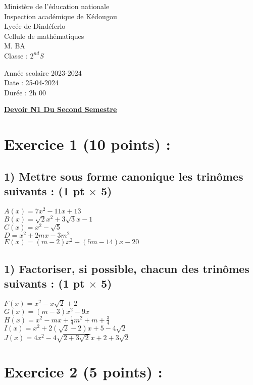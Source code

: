 \documentclass{article}
\begin{document}
\begin{minipage}{0.5\textwidth}
	Ministère de l'éducation nationale  \\
	Inspection académique de Kédougou   \\
	Lycée de Dindéferlo            \\
	Cellule de mathématiques            \\
	M. BA                          \\
	Classe : $2^{nd}S$  \\
\end{minipage}
\begin{minipage}{0.5\textwidth}
	Année scolaire 2023-2024 \\
	Date : 25-04-2024 \\
	Durée : 2h 00 \\
\end{minipage}

\begin{center}
	\textbf{{\underline{Devoir N1 Du Second Semestre}}}
\end{center}

\section*{Exercice 1 (10 points) :}
\subsection*{1) Mettre sous forme canonique les trinômes suivants : (1 pt $\times$ 5)}
$A(x) = 7x^{2}-11x + 13$\\
$B(x) =\sqrt{2}x^{2}+3\sqrt{3}x-1$\\
$C(x) =x^{2}-\sqrt{5}$\\
$D =x^{2} + 2mx-3m^{2}$\\
$E(x) =(m-2)x^{2}+(5m-14)x-20$
\subsection*{1) Factoriser, si possible, chacun des trinômes suivants : (1 pt $\times$ 5)}
$F(x) =x^{2}-x\sqrt{2}+2$\\
$G(x)=(m-3)x^{2}-9x$\\ 
$H(x)=x^{2}-mx +\frac{1}{4}m^{2}+m+\frac{3}{4}$\\ 
$I(x)= x^{2} + 2(\sqrt{2}-2)x+5-4\sqrt{2}$\\ 
$J(x)=4x^{2}-4\sqrt{2+3\sqrt{2}}x+2+3\sqrt{2}$\\
\section*{Exercice 2 (5 points) :}
\end{document}
